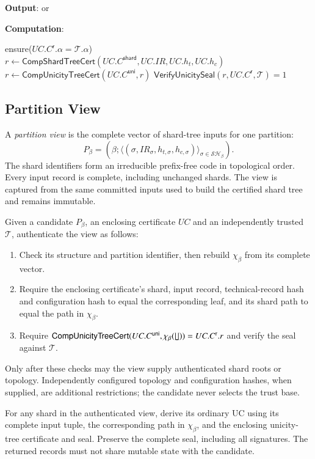 \textbf{Output}: \TRUE or \FALSE

\textbf{Computation}:

\begin{algorithmic}[0]
	\State ensure($UC.C^\mathsf{r}.\alpha = \mathcal{T}.\alpha$)
	\State $r\gets \mathsf{CompShardTreeCert}(UC.C^\mathsf{shard}, UC.IR, UC.h_t, UC.h_c)$
	\State $r\gets \mathsf{CompUnicityTreeCert}(UC.C^\mathsf{uni}, r)$
	\State \Return $\mathsf{VerifyUnicitySeal}(r, UC.C^\mathsf{r}, \mathcal{T}) = 1$
\end{algorithmic}


\subsection{Partition View}\label{sec:partition-view}

A \emph{partition view} is the complete vector of shard-tree inputs for one partition:
\[
P_\beta=(\beta;\langle(\sigma,IR_\sigma,h_{t,\sigma},h_{c,\sigma})\rangle_{\sigma\in\mathcal{SH}_\beta}).
\]
The shard identifiers form an irreducible prefix-free code in topological order. Every input record is complete, including unchanged shards. The view is captured from the same committed inputs used to build the certified shard tree and remains immutable.

Given a candidate $P_\beta$, an enclosing certificate $UC$ and an independently trusted $\mathcal{T}$, authenticate the view as follows:
\begin{enumerate}
\item Check its structure and partition identifier, then rebuild $\chi_\beta$ from its complete vector.
\item Require the enclosing certificate's shard, input record, technical-record hash and configuration hash to equal the corresponding leaf, and its shard path to equal the path in $\chi_\beta$.
\item Require $\mathsf{CompUnicityTreeCert}(UC.C^\mathsf{uni},\chi_\beta(\lfloor\!\rfloor))=UC.C^\mathsf{r}.r$ and verify the seal against $\mathcal{T}$.
\end{enumerate}
Only after these checks may the view supply authenticated shard roots or topology. Independently configured topology and configuration hashes, when supplied, are additional restrictions; the candidate never selects the trust base.

For any shard in the authenticated view, derive its ordinary UC using its complete input tuple, the corresponding path in $\chi_\beta$, and the enclosing unicity-tree certificate and seal. Preserve the complete seal, including all signatures. The returned records must not share mutable state with the candidate.

